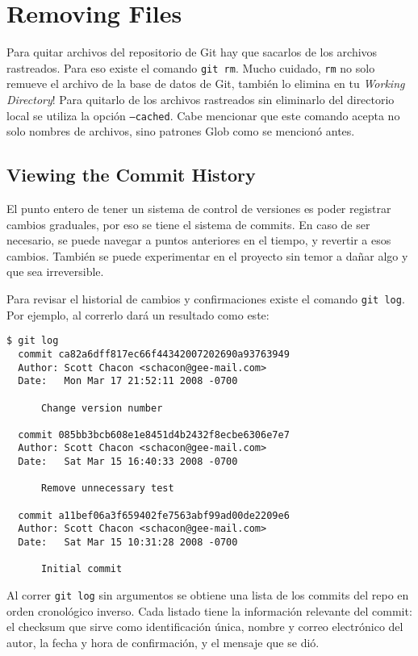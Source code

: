 \documentclass[spanish, 12pt, a4paper]{article}
\begin{document}
\section{Removing Files}
Para quitar archivos del repositorio de Git hay que sacarlos de los archivos
rastreados.
Para eso existe el comando \texttt{git rm}.
Mucho cuidado, \texttt{rm} no solo remueve el archivo de la base de datos de
Git, también lo elimina en tu \textit{Working Directory}!
Para quitarlo de los archivos rastreados sin eliminarlo del directorio local se
utiliza la opción \texttt{--cached}.
Cabe mencionar que este comando acepta no solo nombres de archivos, sino
patrones Glob como se mencionó antes.

\subsection{Viewing the Commit History}
El punto entero de tener un sistema de control de versiones es poder registrar
cambios graduales, por eso se tiene el sistema de commits.
En caso de ser necesario, se puede navegar a puntos anteriores en el tiempo, y
revertir a esos cambios.
También se puede experimentar en el proyecto sin temor a dañar algo y que sea
irreversible.

Para revisar el historial de cambios y confirmaciones existe el comando
\texttt{git log}.
Por ejemplo, al correrlo dará un resultado como este:
\begin{lstlisting}
$ git log
  commit ca82a6dff817ec66f44342007202690a93763949
  Author: Scott Chacon <schacon@gee-mail.com>
  Date:   Mon Mar 17 21:52:11 2008 -0700

	  Change version number

  commit 085bb3bcb608e1e8451d4b2432f8ecbe6306e7e7
  Author: Scott Chacon <schacon@gee-mail.com>
  Date:   Sat Mar 15 16:40:33 2008 -0700

	  Remove unnecessary test

  commit a11bef06a3f659402fe7563abf99ad00de2209e6
  Author: Scott Chacon <schacon@gee-mail.com>
  Date:   Sat Mar 15 10:31:28 2008 -0700

	  Initial commit
\end{lstlisting}

Al correr \texttt{git log} sin argumentos se obtiene una lista de los commits
del repo en orden cronológico inverso.
Cada listado tiene la información relevante del commit: el checksum que sirve
como identificación única, nombre y correo electrónico del autor, la fecha y
hora de confirmación, y el mensaje que se dió.
\end{document}
